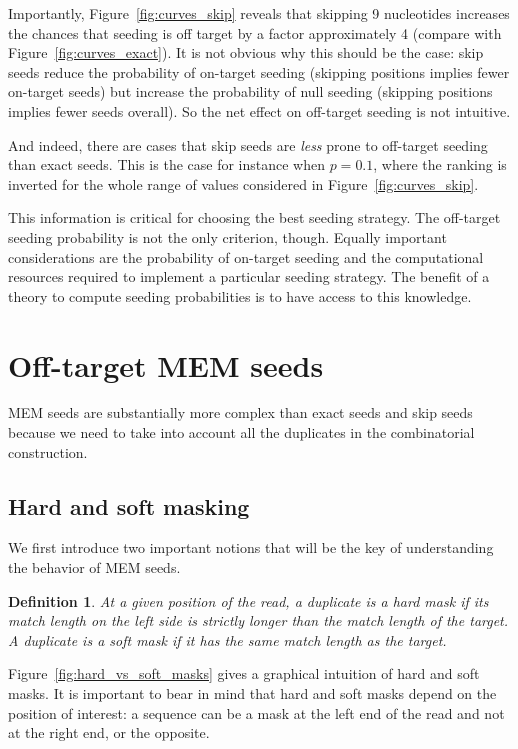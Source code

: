 \documentclass{article}
\newtheorem{definition}{Definition}
\begin{document}
Importantly, Figure~\ref{fig:curves_skip} reveals that skipping 9
nucleotides increases the chances that seeding is off target by a factor
approximately 4 (compare with Figure~\ref{fig:curves_exact}). It is not
obvious why this should be the case: skip seeds reduce the probability of
on-target seeding (skipping positions implies fewer on-target seeds) but
increase the probability of null seeding (skipping positions implies fewer
seeds overall). So the net effect on off-target seeding is not intuitive.

And indeed, there are cases that skip seeds are \emph{less} prone to
off-target seeding than exact seeds. This is the case for instance when
$p=0.1$, where the ranking is inverted for the whole range of values
considered in Figure~\ref{fig:curves_skip}.

This information is critical for choosing the best seeding strategy. The
off-target seeding probability is not the only criterion, though. Equally
important considerations are the probability of on-target seeding and the
computational resources required to implement a particular seeding
strategy. The benefit of a theory to compute seeding probabilities is to
have access to this knowledge.


\section{Off-target MEM seeds}

MEM seeds are substantially more complex than exact seeds and skip seeds
because we need to take into account all the duplicates in the
combinatorial construction.


\subsection{Hard and soft masking}

We first introduce two important notions that will be the key of
understanding the behavior of MEM seeds.

\begin{definition}
At a given position of the read, a duplicate is a \emph{hard mask} if its
match length on the left side is strictly longer than the match length
of the target. A duplicate is a \emph{soft mask} if it has the same match
length as the target.
\end{definition}

Figure~\ref{fig:hard_vs_soft_masks} gives a graphical intuition of hard and
soft masks. It is important to bear in mind that hard and soft masks
depend on the position of interest: a sequence can be a mask at the left
end of the read and not at the right end, or the opposite.
\end{document}
